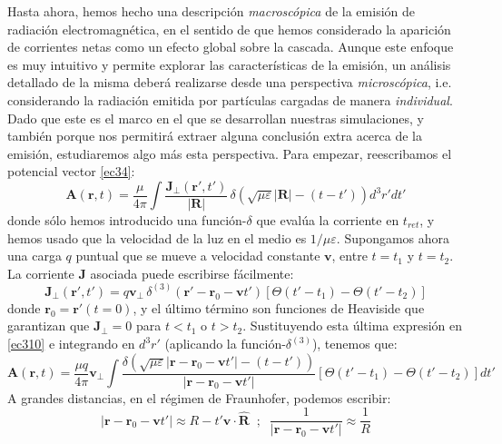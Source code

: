 \documentclass[12 pt, a4paper]{article} %
\numberwithin{equation}{section}
\numberwithin{figure}{section}
\newcommand{\vect}[1]{\boldsymbol{\mathbf{#1}}}
\begin{document}
Hasta ahora, hemos hecho una descripción \textit{macroscópica} de la emisión de radiación electromagnética, en el sentido de que hemos considerado la aparición de corrientes netas como un efecto global sobre la cascada. Aunque este enfoque es muy intuitivo y permite explorar las características de la emisión, un análisis detallado de la misma deberá realizarse desde una perspectiva \textit{microscópica}, i.e. considerando la radiación emitida por partículas cargadas de manera \textit{individual}. Dado que este es el marco en el que se desarrollan nuestras simulaciones, y también porque nos permitirá extraer alguna conclusión extra acerca de la emisión, estudiaremos algo más esta perspectiva. Para empezar, reescribamos el potencial vector \eqref{ec34}:
\begin{equation}
	\vect{A}\left(\vect{r}, t\right)=\frac{\mu}{4\pi}\int \frac{\vect{J}_\perp\left(\vect{r}', t'\right)}{\left|\vect{R}\right|}\,\delta\left(\sqrt{\mu\varepsilon}\left|\vect{R}\right|-\left(t-t'\right)\right)d^3r'dt'\label{ec310}
\end{equation} 
donde sólo hemos introducido una función-$\delta$ que evalúa la corriente en $t_{ret}$, y hemos usado que la velocidad de la luz en el medio es $1/\mu\varepsilon$. Supongamos ahora una carga $q$ puntual que se mueve a velocidad constante $\vect{v}$, entre $t=t_1$ y $t=t_2$. La corriente $\vect{J}$ asociada puede escribirse fácilmente:
\begin{equation}
	\vect{J}_\perp\left(\vect{r'}, t'\right)=q\vect{v}_\perp \,\delta^{(3)}\left(\vect{r}'-\vect{r}_0-\vect{v}t'\right)\left[\Theta\left(t'-t_1\right)-\Theta\left(t'-t_2\right)\right]\label{ec311}
\end{equation}
donde $\vect{r}_0=\vect{r}'\left(t=0\right)$, y el último término son funciones de Heaviside que garantizan que $\vect{J}_\perp=0$ para $t<t_1$ o $t>t_2$. Sustituyendo esta última expresión en \eqref{ec310} e integrando en $d^3r'$ (aplicando la función-$\delta^{(3)}$), tenemos que:
\begin{equation}
	\vect{A}\left(\vect{r}, t\right)=\frac{\mu q}{4\pi}\vect{v}_\perp\int \frac{\delta\left(\sqrt{\mu \varepsilon} \left|\vect{r}-\vect{r}_0-\vect{v}t'\right|-\left(t-t'\right)\right)}{\left|\vect{r}-\vect{r}_0-\vect{v}t'\right|}\left[\Theta\left(t'-t_1\right)-\Theta\left(t'-t_2\right)\right]dt'\label{ec312}
\end{equation}
A grandes distancias, en el régimen de Fraunhofer, podemos escribir:
\begin{equation}
	\left|\vect{r}-\vect{r}_0-\vect{v}t'\right|\approx R-t'\vect{v}\cdot\hat{\vect{R}}\;\;;\;\;\frac{1}{\left|\vect{r}-\vect{r}_0-\vect{v}t'\right|} \approx \frac{1}{R}\label{ec313}
\end{equation}
\end{document}

